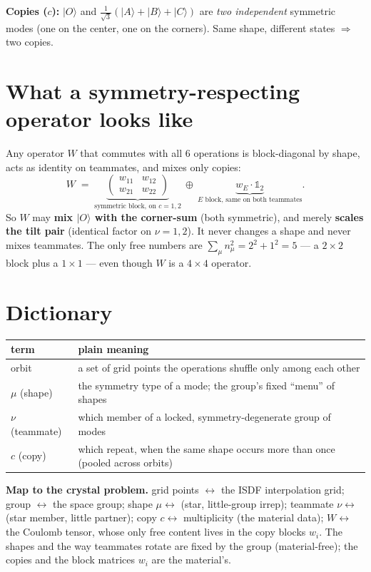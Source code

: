\documentclass[11pt]{article}
\newcommand{\ket}[1]{\lvert #1\rangle}
\begin{document}
\textbf{Copies ($c$):} $\ket{O}$ and $\tfrac1{\sqrt3}(\ket A+\ket B+\ket C)$ are \emph{two independent}
symmetric modes (one on the center, one on the corners). Same shape, different states $\Rightarrow$ two
copies.

\section{What a symmetry-respecting operator looks like}
Any operator $W$ that commutes with all 6 operations is block-diagonal by shape, acts as identity on
teammates, and mixes only copies:
\[
   W \;=\; \underbrace{\begin{pmatrix} w_{11} & w_{12}\\ w_{21} & w_{22}\end{pmatrix}}_{\text{symmetric block, on }c=1,2}
   \ \oplus\ \underbrace{w_E\cdot\mathbb 1_2}_{\text{$E$ block, same on both teammates}} .
\]
So $W$ may \textbf{mix $\ket O$ with the corner-sum} (both symmetric), and merely \textbf{scales the tilt
pair} (identical factor on $\nu=1,2$). It never changes a shape and never mixes teammates. The only free
numbers are $\sum_\mu n_\mu^2 = 2^2+1^2 = 5$ --- a $2\times2$ block plus a $1\times1$ --- even though $W$
is a $4\times4$ operator.

\section{Dictionary}
\begin{center}\begin{tabular}{ll}
\toprule
term & plain meaning \\
\midrule
orbit & a set of grid points the operations shuffle only among each other \\
$\mu$ (shape) & the symmetry type of a mode; the group's fixed ``menu'' of shapes \\
$\nu$ (teammate) & which member of a locked, symmetry-degenerate group of modes \\
$c$ (copy) & which repeat, when the same shape occurs more than once (pooled across orbits) \\
\bottomrule
\end{tabular}\end{center}

\textbf{Map to the crystal problem.} grid points $\leftrightarrow$ the ISDF interpolation grid;
group $\leftrightarrow$ the space group; shape $\mu \leftrightarrow$ (star, little-group irrep); teammate
$\nu \leftrightarrow$ (star member, little partner); copy $c \leftrightarrow$ multiplicity (the material
data); $W \leftrightarrow$ the Coulomb tensor, whose only free content lives in the copy blocks $w_i$.
The shapes and the way teammates rotate are fixed by the group (material-free); the copies and the block
matrices $w_i$ are the material's.
\end{document}
